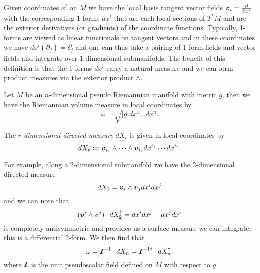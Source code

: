 Given coordinates $x^i$ on $M$ we have the local basis tangent vector fields $\boldsymbol{v}_i=\frac{\partial}{\partial x^i}$ with the corresponding 1-forms $dx^i$ that are each local sections of $T^*M$ and are the exterior derivatives (or gradients) of the coordinate functions.  Typically, 1-forms are viewed as linear functionals on tangent vectors and in these coordinates we have $dx^i  (\partial_j) = \delta^i_j$ and one can thus take a pairing of 1-form fields and vector fields and integrate over 1-dimensional submanifolds. The benefit of this definition is that the 1-forms $dx^i$ carry a natural measure and we can form product measures via the exterior product $\wedge$.

Let $M$ be an $n$-dimensional pseudo Riemannian manifold with metric $g$, then we have the Riemannian volume measure in local coordinates by
\begin{equation}
\omega = \sqrt{|g|} dx^1\dots dx^n.
\end{equation}
\begin{definition}
The \emph{$r$-dimensional directed measure} $dX_r$ is given in local coordinates by
\begin{equation}
    dX_r \coloneqq \boldsymbol{v}_{i_1} \wedge \cdots \wedge \boldsymbol{v}_{i_r} dx^{i_1} \cdots dx^{i_r}. 
\end{equation}
\end{definition}
For example, along a 2-dimensional submanifold we have the 2-dimensional directed measure 
\begin{equation}
    dX_2 = \boldsymbol{v}_i \wedge \boldsymbol{v}_j dx^i dx^j
\end{equation}
and we can note that 
\begin{equation}
(\boldsymbol{v}^i \wedge \boldsymbol{v}^j)\cdot dX_2^\dagger = dx^idx^j - dx^j dx^i
\end{equation}
is completely antisymmetric and provides us a surface measure we can integrate; this is a differential 2-form. We then find that
\begin{equation}
\label{eq:volume_form}
\omega = \boldsymbol{I}^{-1} \cdot dX_n = \boldsymbol{I}^{-1 \dagger} \cdot dX_n^\dagger,
\end{equation}
where $\boldsymbol{I}$ is the unit pseudoscalar field defined on $M$ with respect to $g$. 

